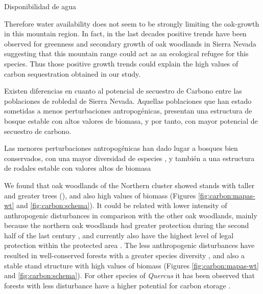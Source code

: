 Disponibilidad de agua 

Therefore water availability does not seem to be strongly limiting the oak-growth in this mountain region. In fact, in the last decades positive trends have been observed for greenness and secondary growth of oak woodlands in Sierra Nevada \autocite{GeaIzquierdoCanellas2014LocalClimate,PerezLuqueetal2020LanduseLegacies,RubioCuadradoetal2018AbioticFactors} suggesting that this mountain range could act as an ecological refugee for this species. Thus those positive growth trends could explain the high values of carbon sequestration obtained in our study.

Existen diferencias en cuanto al potencial de secuestro de Carbono entre las poblaciones de robledal de Sierra Nevada. Aquellas poblaciones que han estado sometidas a menos perturbaciones antropogénicas, presentan una estructura de bosque estable con altos valores de biomasa, y por tanto, con mayor potencial de secuestro de carbono. 






Las menores perturbaciones antropogénicas han dado lugar a bosques bien conservados, con una mayor diversidad de especies , y también a una estructura de rodales estable con valores altos de biomasa

We found that oak woodlands of the Northern cluster showed stands with taller and greater trees (), and also high values of biomass (Figures \ref{fig:carbon:mapas-wt} and \ref{fig:carbon:schema}). It could be related with lower intensity of anthropogenic disturbances in comparison with the other oak woodlands, mainly because the northern oak woodlands had greater protection during the second half of the last century \autocite{JimenezOlivencia1991PaisajesSierra}, and currently also have the highest level of legal protection within the protected area \autocite{Anonymous2011Decreto238}. The less anthropogenic disturbances have resulted in well-conserved forests with a greater species diversity \autocite{PerezLuqueetal2021EcologicalDiversity}, and also a stable stand structure with high values of biomass (Figures \ref{fig:carbon:mapas-wt} and \ref{fig:carbon:schema}). For other species of \emph{Quercus} it has been observed that forests with less disturbance have a higher potential for carbon storage \autocite{BalboaMuriasetal2006CarbonNutrient,Cotillasetal2016AbovegroundBelowground,Stojanovicetal2017ForecastingTree}.















